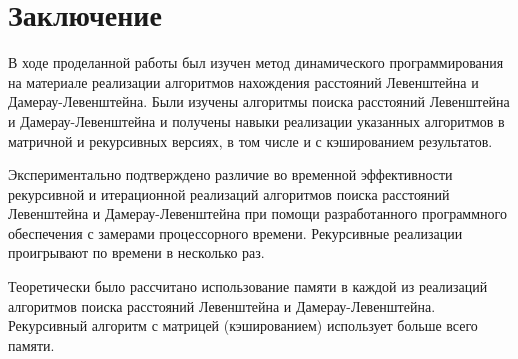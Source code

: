 \documentclass[12pt]{report}
\begin{document}
    \chapter*{Заключение}
    В ходе проделанной работы был изучен метод динамического программирования на материале реализации
    алгоритмов нахождения расстояний Левенштейна и Дамерау-Левенштейна.
    Были изучены алгоритмы поиска расстояний Левенштейна и Дамерау-Левенштейна и получены навыки
    реализации указанных алгоритмов в матричной и рекурсивных версиях, в том числе и с кэшированием результатов.

    Экспериментально подтверждено различие во временной эффективности рекурсивной и итерационной
    реализаций алгоритмов поиска расстояний Левенштейна и Дамерау-Левенштейна
    при помощи разработанного программного обеспечения с замерами процессорного времени.
    Рекурсивные реализации проигрывают по времени в несколько раз.

    Теоретически было рассчитано использование памяти в каждой из реализаций алгоритмов поиска
    расстояний Левенштейна и Дамерау-Левенштейна. Рекурсивный алгоритм с матрицей (кэшированием)
    использует больше всего памяти.


\end{document}

